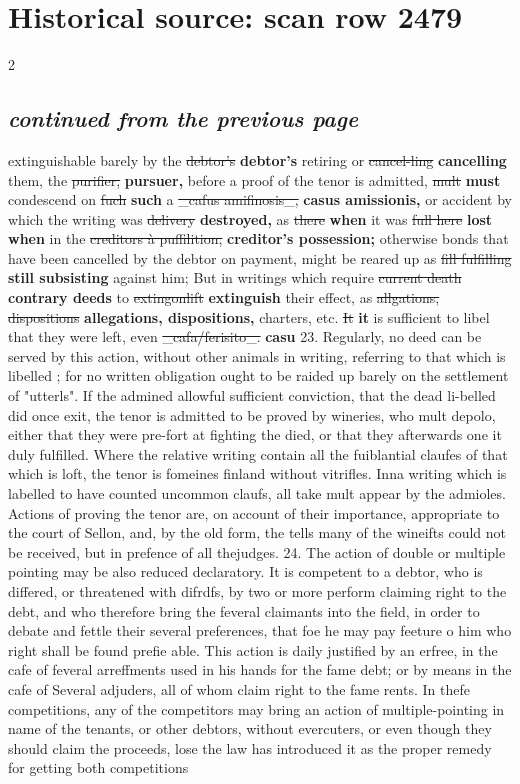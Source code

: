 \documentclass[10pt]{article}
\begin{document}
\section*{Historical source: scan row 2479}
\begin{multicols}{2}
\subsection*{\textit{continued from the previous page}}
extinguishable barely by the \sout{debtor’s} \textbf{debtor's} retiring or \sout{cancel-ling} \textbf{cancelling} them, the \sout{purifier,} \textbf{pursuer,} before a proof of the tenor is admitted, \sout{mult} \textbf{must} condescend on \sout{fuch} \textbf{such} a \sout{\_cafus amifinosis\_,} \textbf{casus amissionis,} or accident by which the writing was \sout{delivery} \textbf{destroyed,} as \sout{there} \textbf{when} it was \sout{full here} \textbf{lost when} in the \sout{creditors à puffilition,} \textbf{creditor's possession;} otherwise bonds that have been cancelled by the debtor on payment, might be reared up as \sout{fill fulfilling} \textbf{still subsisting} against him; But in writings which require \sout{current death} \textbf{contrary deeds} to \sout{extingonlift} \textbf{extinguish} their effect, as \sout{allgations, dispositions} \textbf{allegations, dispositions,} charters, etc. \sout{It} \textbf{it} is sufficient to libel that they were left, even \sout{\_cafa/ferisito\_.} \textbf{casu} 23. Regularly, no deed can be served by this action, without other animals in writing, referring to that which is libelled ; for no written obligation ought to be raided up barely on the settlement of "utterls". If the admined allowful sufficient conviction, that the dead li-belled did once exit, the tenor is admitted to be proved by wineries, who mult depolo, either that they were pre-fort at fighting the died, or that they afterwards one it duly fulfilled. Where the relative writing contain all the fuiblantial claufes of that which is loft, the tenor is fomeines finland without vitrifles. Inna writing which is labelled to have counted uncommon claufs, all take mult appear by the admioles. Actions of proving the tenor are, on account of their importance, appropriate to the court of Sellon, and, by the old form, the tells many of the wineifts could not be received, but in prefence of all thejudges. 24. The action of double or multiple pointing may be also reduced declaratory. It is competent to a debtor, who is differed, or threatened with difrdfs, by two or more perform claiming right to the debt, and who therefore bring the feveral claimants into the field, in order to debate and fettle their several preferences, that foe he may pay feeture o him who right shall be found prefie able. This action is daily justified by an erfree, in the cafe of feveral arreffments used in his hands for the fame debt; or by means in the cafe of Several adjuders, all of whom claim right to the fame rents. In thefe competitions, any of the competitors may bring an action of multiple-pointing in name of the tenants, or other debtors, without evercuters, or even though they should claim the proceeds, lose the law has introduced it as the proper remedy for getting both competitions 
\end{multicols}
\end{document}
